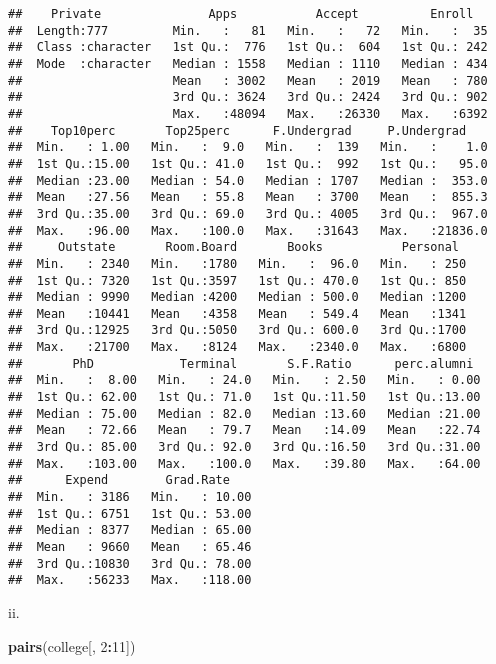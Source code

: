 \documentclass[
]{article}
\newenvironment{Shaded}{\begin{snugshade}}{\end{snugshade}}
\newcommand{\DecValTok}[1]{\textcolor[rgb]{0.00,0.00,0.81}{#1}}
\newcommand{\FunctionTok}[1]{\textcolor[rgb]{0.13,0.29,0.53}{\textbf{#1}}}
\newcommand{\NormalTok}[1]{#1}
\newcommand{\SpecialCharTok}[1]{\textcolor[rgb]{0.81,0.36,0.00}{\textbf{#1}}}
\begin{document}
\begin{verbatim}
##    Private               Apps           Accept          Enroll    
##  Length:777         Min.   :   81   Min.   :   72   Min.   :  35  
##  Class :character   1st Qu.:  776   1st Qu.:  604   1st Qu.: 242  
##  Mode  :character   Median : 1558   Median : 1110   Median : 434  
##                     Mean   : 3002   Mean   : 2019   Mean   : 780  
##                     3rd Qu.: 3624   3rd Qu.: 2424   3rd Qu.: 902  
##                     Max.   :48094   Max.   :26330   Max.   :6392  
##    Top10perc       Top25perc      F.Undergrad     P.Undergrad     
##  Min.   : 1.00   Min.   :  9.0   Min.   :  139   Min.   :    1.0  
##  1st Qu.:15.00   1st Qu.: 41.0   1st Qu.:  992   1st Qu.:   95.0  
##  Median :23.00   Median : 54.0   Median : 1707   Median :  353.0  
##  Mean   :27.56   Mean   : 55.8   Mean   : 3700   Mean   :  855.3  
##  3rd Qu.:35.00   3rd Qu.: 69.0   3rd Qu.: 4005   3rd Qu.:  967.0  
##  Max.   :96.00   Max.   :100.0   Max.   :31643   Max.   :21836.0  
##     Outstate       Room.Board       Books           Personal   
##  Min.   : 2340   Min.   :1780   Min.   :  96.0   Min.   : 250  
##  1st Qu.: 7320   1st Qu.:3597   1st Qu.: 470.0   1st Qu.: 850  
##  Median : 9990   Median :4200   Median : 500.0   Median :1200  
##  Mean   :10441   Mean   :4358   Mean   : 549.4   Mean   :1341  
##  3rd Qu.:12925   3rd Qu.:5050   3rd Qu.: 600.0   3rd Qu.:1700  
##  Max.   :21700   Max.   :8124   Max.   :2340.0   Max.   :6800  
##       PhD            Terminal       S.F.Ratio      perc.alumni   
##  Min.   :  8.00   Min.   : 24.0   Min.   : 2.50   Min.   : 0.00  
##  1st Qu.: 62.00   1st Qu.: 71.0   1st Qu.:11.50   1st Qu.:13.00  
##  Median : 75.00   Median : 82.0   Median :13.60   Median :21.00  
##  Mean   : 72.66   Mean   : 79.7   Mean   :14.09   Mean   :22.74  
##  3rd Qu.: 85.00   3rd Qu.: 92.0   3rd Qu.:16.50   3rd Qu.:31.00  
##  Max.   :103.00   Max.   :100.0   Max.   :39.80   Max.   :64.00  
##      Expend        Grad.Rate     
##  Min.   : 3186   Min.   : 10.00  
##  1st Qu.: 6751   1st Qu.: 53.00  
##  Median : 8377   Median : 65.00  
##  Mean   : 9660   Mean   : 65.46  
##  3rd Qu.:10830   3rd Qu.: 78.00  
##  Max.   :56233   Max.   :118.00
\end{verbatim}

ii.

\begin{Shaded}
\begin{Highlighting}[]
\FunctionTok{pairs}\NormalTok{(college[, }\DecValTok{2}\SpecialCharTok{:}\DecValTok{11}\NormalTok{])}
\end{Highlighting}
\end{Shaded}
\end{document}
